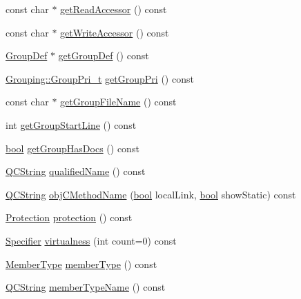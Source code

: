 \begin{DoxyCompactItemize}
\item 
const char $\ast$ \hyperlink{class_member_def_a6657ee14f3c162942677b2c491c4b05b}{get\+Read\+Accessor} () const 
\item 
const char $\ast$ \hyperlink{class_member_def_a9fd1fdd812ee52b9fc2bc730225ba1df}{get\+Write\+Accessor} () const 
\item 
\hyperlink{class_group_def}{Group\+Def} $\ast$ \hyperlink{class_member_def_a9ffacead6161b28cb51541bb83cf56f0}{get\+Group\+Def} () const 
\item 
\hyperlink{struct_grouping_a9f0ec5ab376b083ebe3274ea79fd2d70}{Grouping\+::\+Group\+Pri\+\_\+t} \hyperlink{class_member_def_addc567265249cd246c7faeb10c837511}{get\+Group\+Pri} () const 
\item 
const char $\ast$ \hyperlink{class_member_def_a88391fdd5c563a1bfd64cb132620b344}{get\+Group\+File\+Name} () const 
\item 
int \hyperlink{class_member_def_a353f3720eb1dc68838a6e83cce798606}{get\+Group\+Start\+Line} () const 
\item 
\hyperlink{qglobal_8h_a1062901a7428fdd9c7f180f5e01ea056}{bool} \hyperlink{class_member_def_a83a10f1a086938b3e1086c303210edb3}{get\+Group\+Has\+Docs} () const 
\item 
\hyperlink{class_q_c_string}{Q\+C\+String} \hyperlink{class_member_def_a51e9fb5513286c69c8e3f95e968f7ba1}{qualified\+Name} () const 
\item 
\hyperlink{class_q_c_string}{Q\+C\+String} \hyperlink{class_member_def_accdce1c40a31aae410cd6a0aff3c6172}{obj\+C\+Method\+Name} (\hyperlink{qglobal_8h_a1062901a7428fdd9c7f180f5e01ea056}{bool} local\+Link, \hyperlink{qglobal_8h_a1062901a7428fdd9c7f180f5e01ea056}{bool} show\+Static) const 
\item 
\hyperlink{types_8h_a90e352184df58cd09455fe9996cd4ded}{Protection} \hyperlink{class_member_def_ad6bb705b086fda7d8d5d7c0006bf76e5}{protection} () const 
\item 
\hyperlink{types_8h_ab16236bdd10ddf4d73a9847350f0017e}{Specifier} \hyperlink{class_member_def_a273dab8824fe95c025fa1fc83a7ee2a6}{virtualness} (int count=0) const 
\item 
\hyperlink{types_8h_a63e3de542c5d38de617ab78c8c8f5a41}{Member\+Type} \hyperlink{class_member_def_ab6cb7415ceccf3c1ef29c50252d4d6fd}{member\+Type} () const 
\item 
\hyperlink{class_q_c_string}{Q\+C\+String} \hyperlink{class_member_def_a6ac20fabeddf4873d2d232c1dc9a73cc}{member\+Type\+Name} () const 
\item 

\end{DoxyCompactItemize}
